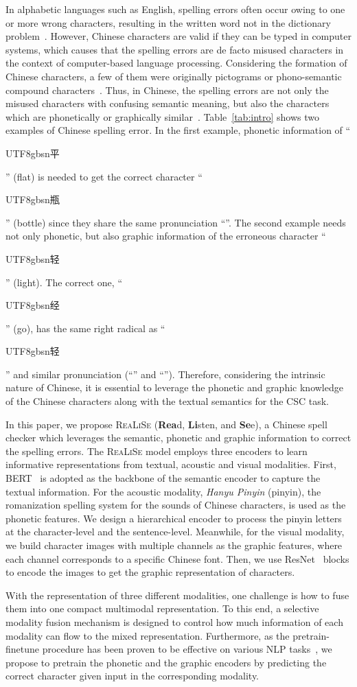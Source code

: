 \documentclass[11pt,a4paper]{article}
\newcommand\model{\textsc{ReaLiSe}}
\newcommand{\cjksong}[1]{{{\begin{CJK*}{UTF8}{gbsn}#1\end{CJK*}}}}
\begin{document}
In alphabetic languages such as English, spelling errors often occur owing to one or more wrong characters, resulting in the written word not in the dictionary problem~\citep{en-sec}.
However, 
Chinese characters are valid if they can be typed in computer systems, which causes that the spelling errors are de facto misused characters in the context of computer-based language processing.
Considering the formation of Chinese characters, a few of them were originally pictograms or phono-semantic compound characters~\citep{norman1988chinese}.
Thus, in Chinese, the spelling errors are not only the misused characters with confusing semantic meaning, but also the characters which are phonetically or graphically similar~\cite{vis-pho-ratio,similar-character}. Table~\ref{tab:intro} shows two examples of Chinese spelling error.
In the first example, phonetic information of ``\cjksong{平}'' (flat) is needed to get the correct character ``\cjksong{瓶}'' (bottle) since they share the same pronunciation ``''.
The second example needs not only phonetic, but also graphic information of the erroneous character ``\cjksong{轻}'' (light).
The correct one, ``\cjksong{经}'' (go), has the same right radical as ``\cjksong{轻}'' and similar pronunciation (``'' and ``'').
Therefore, considering the intrinsic nature of Chinese, it is essential to leverage the phonetic and graphic knowledge of the Chinese characters along with the textual semantics for the CSC task.


In this paper, we propose \textsc{ReaLiSe} (\textbf{Rea}d, \textbf{Li}sten, and \textbf{Se}e), a Chinese spell checker which leverages the semantic, phonetic and graphic information to correct the spelling errors.
The \model{} model employs three encoders to learn informative representations from textual, acoustic and visual modalities.
First, BERT~\citep{bert} is adopted as the backbone of the semantic encoder to capture the textual information. 
For the acoustic modality, \textit{Hanyu Pinyin} (pinyin), the romanization spelling system for the sounds of Chinese characters, is used as the phonetic features. We design a hierarchical encoder to process the pinyin letters at the character-level and the sentence-level.
Meanwhile, for the visual modality, we build character images with multiple channels as the graphic features, where each channel corresponds to a specific Chinese font.
Then, we use ResNet~\citep{resnet} blocks to encode the images to get the graphic representation of characters.


With the representation of three different modalities, one challenge is how to fuse them into one compact multimodal representation.
To this end, a selective modality fusion mechanism is designed to control how much information of each modality can flow to the mixed representation.
Furthermore, as the pretrain-finetune procedure has been proven to be effective on various NLP tasks~\citep{bert,unilm,ernie2}, we propose to pretrain the phonetic and the graphic encoders by predicting the correct character given input in the corresponding modality.
\end{document}
